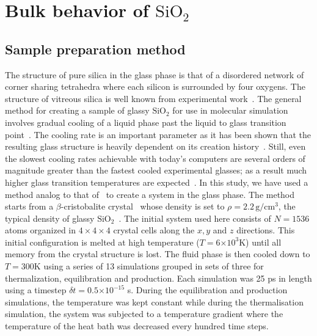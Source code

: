 \documentclass[aps,10pt,twocolumn]{revtex4}
\newcommand{\mrm}[1]{\ensuremath{\mathrm{#1}}\xspace}
\newcommand{\SiOTwo}{\ensuremath{\mrm{SiO_2}}\xspace}
\newcommand{\e}[1]{\ensuremath{\times 10^{#1}}}
\begin{document}
\section{Bulk behavior of \SiOTwo}
\label{s:bulk}

\subsection{Sample preparation method}

The structure of pure silica in the glass phase is that of a disordered network of corner
sharing tetrahedra where each silicon is surrounded by four oxygens. The structure of vitreous
silica is well known from experimental
work~\cite{MozziWarren69,Bruckner70,JohnsonWright83,Wright94}.
The general method for creating a sample of glassy \SiOTwo for use in molecular simulation involves
gradual cooling of a liquid phase past the liquid to glass transition
point~\cite{VashishtaKalia90,HorbackKob99}. The cooling rate is an important parameter as
it has been shown that the resulting glass structure is heavily dependent on its creation
history~\cite{VollmayrKob96}. Still, even the slowest cooling rates achievable with today's
computers are several orders of magnitude greater than the fastest cooled experimental glasses;
as a result much higher glass transition temperatures are
expected~\cite{VollmayrKob96,YuanCormack01,ColuzziVerrocchio02}. 
In this study, we have used a method analog to that of~\cite{VashishtaKalia90} to create a
system in the glass phase. The method starts from a $\beta$-cristobalite crystal~\cite{Wickoff} whose 
density is set to $\rho=2.2\, \mrm{g/cm^{3}}$, the  typical density of glassy
\SiOTwo~\cite{Weast}. The initial system used here consists of $N=1536$ atoms organized in
$4\times4\times4$ crystal cells along the $x,y$ and $z$ directions.
This initial configuration is melted at high temperature  ($T=6\e{3}\mrm{K}$) until all
memory from the crystal structure is lost. The fluid phase is then cooled down to $T=300 \mrm{K}$ using 
a series of 13 simulations grouped in sets of three for thermalization, equilibration and
production. Each simulation was 25 ps in length using a timestep $\delta t=0.5\e{-15}$ s. During
the equilibration and production simulations, the temperature was kept constant while during the
thermalisation simulation, the system was subjected to a temperature gradient where the
temperature of the heat bath was decreased every hundred time steps.
\end{document}
